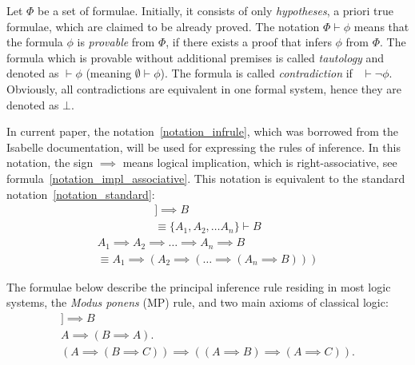 \documentclass[article]{aaltoseries}
\begin{document}
Let $\Phi$ be a set of formulae. Initially, it consists of only \textit{hypotheses}, a priori true formulae, which are claimed to be already proved. The notation $\Phi \vdash \phi$ means that the formula $\phi$ is \textit{provable} from $\Phi$, if there exists a proof that infers $\phi$ from $\Phi$. The formula which is provable without additional premises is called \textit{tautology} and denoted as $ \vdash \phi $ (meaning $\emptyset \vdash \phi$). The formula is called \textit{contradiction} if \ $\vdash \neg \phi$. Obviously, all contradictions are equivalent in one formal system, hence they are denoted as $\bot$.

In current paper, the notation~\eqref{notation_infrule}, which was borrowed from the Isabelle documentation, will be used for expressing the rules of inference. In this notation, the sign $\implies$ means logical implication, which is right-associative, see formula~\eqref{notation_impl_associative}. This notation is equivalent to the standard notation~\eqref{notation_standard}:
\begin{gather}
[\![ A_{1}; A_{2}; \dots A_{n} ]\!] \implies B 
    \label{notation_infrule}\\
\equiv \{ A_{1}, A_{2}, \dots A_{n} \} \vdash B
    \label{notation_standard}
\end{gather}
\begin{equation}\label{notation_impl_associative}
\begin{aligned}
A_{1} \implies A_{2} \implies \dots \implies A_{n} \implies B \\
\equiv  A_{1} \implies ( A_{2} \implies ( \dots \implies ( A_{n} \implies B)))
\end{aligned}
\end{equation}


The formulae below describe the principal inference rule residing in most logic systems, the \textit{Modus ponens} (MP) rule, and two main axioms of classical logic:
\begin{gather}
[\![ A, A \implies B ]\!] \implies B
    \label{rule_modus_ponens}\tag{MP} \\
%
A \implies (B \implies A).
	\label{axiom_hilbert_1}\tag{A1} \\
%
(A \implies (B \implies C)) \implies ((A \implies B) \implies (A \implies C)).
	\label{axiom_hilbert_2}\tag{A2}
\end{gather}
\end{document}
